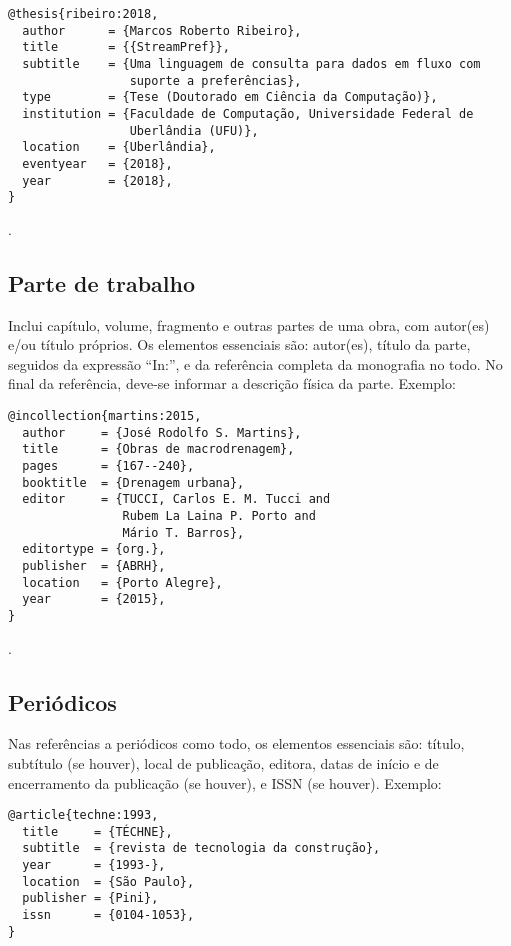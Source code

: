 \begin{verbatim}
@thesis{ribeiro:2018,
  author      = {Marcos Roberto Ribeiro},
  title       = {{StreamPref}},
  subtitle    = {Uma linguagem de consulta para dados em fluxo com
                 suporte a preferências},
  type        = {Tese (Doutorado em Ciência da Computação)},
  institution = {Faculdade de Computação, Universidade Federal de
                 Uberlândia (UFU)},
  location    = {Uberlândia},
  eventyear   = {2018},
  year        = {2018},
}
\end{verbatim}

\noindent
{}.

\subsection{Parte de trabalho}

Inclui capítulo, volume, fragmento e outras partes de uma obra, com autor(es) e/ou título próprios.
Os elementos essenciais são: autor(es), título da parte, seguidos da expressão ``In:'', e da referência completa da monografia no todo. No final da referência, deve-se informar a descrição física da parte.
Exemplo:

\vspace*{1em}

\begin{verbatim}
@incollection{martins:2015,
  author     = {José Rodolfo S. Martins},
  title      = {Obras de macrodrenagem},
  pages      = {167--240},
  booktitle  = {Drenagem urbana},
  editor     = {TUCCI, Carlos E. M. Tucci and
                Rubem La Laina P. Porto and
                Mário T. Barros},
  editortype = {org.},
  publisher  = {ABRH},
  location   = {Porto Alegre},
  year       = {2015},
}
\end{verbatim}

\noindent
{}.

\subsection{Periódicos}

Nas referências a periódicos como todo, os elementos essenciais são: título, subtítulo (se houver), local de publicação, editora, datas de início e de encerramento da publicação (se houver), e ISSN (se houver).
Exemplo:

\vspace*{1em}

\begin{verbatim}
@article{techne:1993,
  title     = {TÉCHNE},
  subtitle  = {revista de tecnologia da construção},
  year      = {1993-},
  location  = {São Paulo},
  publisher = {Pini},
  issn      = {0104-1053},
}
\end{verbatim}

